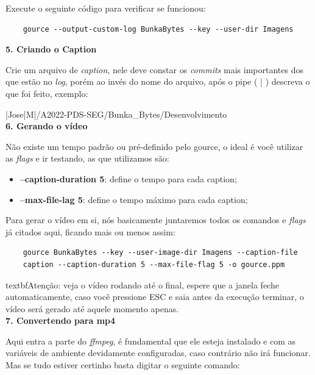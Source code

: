 Execute o seguinte código para verificar se funcionou:

\lstset{language=Fortran,
             basicstyle=\ttfamily\small,
             showstringspaces=false
    }
        \begin{lstlisting} 
    gource --output-custom-log BunkaBytes --key --user-dir Imagens
        \end{lstlisting}

\textbf{5. Criando o Caption}

Crie um arquivo de \textit{caption}, nele deve constar os \textit{commits} mais importantes dos que estão no \textit{log}, porém ao invés do nome do arquivo, após o pipe ( | ) descreva o que foi feito, exemplo:

|Jose|M|/A2022-PDS-SEG/Bunka\_Bytes/Desenvolvimento \\

\textbf{6. Gerando o vídeo}

Não existe um tempo padrão ou pré-definido pelo \gls{gource}, o ideal é você utilizar as \textit{flags} e ir testando, as que utilizamos são:

\begin{itemize}
    \item \textbf{--caption-duration 5}: define o tempo para cada caption;
    \item \textbf{--max-file-lag 5}: define o tempo máximo para cada caption; 
\end{itemize}

Para gerar o vídeo em si, nós basicamente juntaremos todos os comandos e \textit{flags} já citados aqui, ficando mais ou menos assim:

\lstset{language=Fortran,
             basicstyle=\ttfamily\small,
             showstringspaces=false
    }
        \begin{lstlisting} 
    gource BunkaBytes --key --user-image-dir Imagens --caption-file 
    caption --caption-duration 5 --max-file-flag 5 -o gource.ppm 
        \end{lstlisting}
  
textbf{Atenção:}  veja o vídeo rodando até o final, espere que a janela feche automaticamente, caso você pressione ESC e saia antes da execução terminar, o vídeo será gerado até aquele momento apenas.\\

\textbf{7. Convertendo para mp4}

Aqui entra a parte do \textit{ffmpeg}, é fundamental que ele esteja instalado e com as variáveis de ambiente devidamente configuradas, caso contrário não irá funcionar. Mas se tudo estiver certinho basta digitar o seguinte comando:

